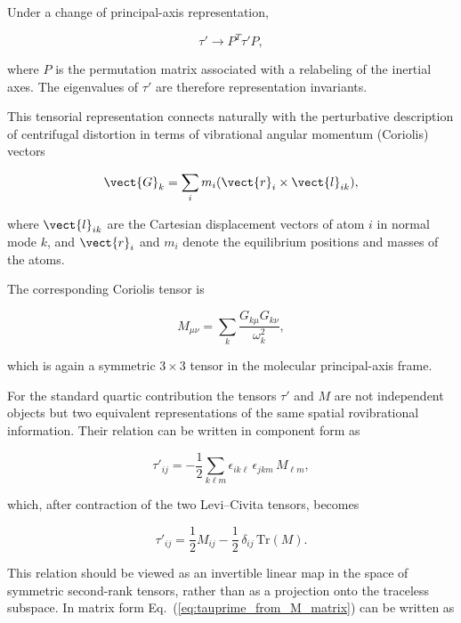 Under a change of principal-axis representation,

\begin{equation}
\tau' \longrightarrow P^{T}\tau' P,
\end{equation}

where $P$ is the permutation matrix associated with a relabeling of the
inertial axes.
The eigenvalues of $\tau'$ are therefore representation invariants.

This tensorial representation connects naturally with the perturbative
description of centrifugal distortion in terms of vibrational angular
momentum (Coriolis) vectors

\begin{equation}
\vect{G}_k =
\sum_i
m_i
(\vect{r}_i \times \vect{l}_{ik}),
\end{equation}

where $\vect{l}_{ik}$ are the Cartesian displacement vectors of atom
$i$ in normal mode $k$, and $\vect{r}_i$ and $m_i$ denote the equilibrium
positions and masses of the atoms.\cite{Mills1972,Wilson1955}

The corresponding Coriolis tensor is

\begin{equation}
M_{\mu\nu}=
\sum_k \frac{G_{k\mu}G_{k\nu}}{\omega_k^2},
\label{eq:Mtensor}
\end{equation}

which is again a symmetric $3\times3$ tensor in the molecular
principal-axis frame.

For the standard quartic contribution the tensors $\tau'$ and $M$
are not independent objects but two equivalent representations of the
same spatial rovibrational information.
Their relation can be written in component form as

\begin{equation}
\tau'_{ij}
=
-\frac12
\sum_{k\ell m}
\epsilon_{ik\ell}\,\epsilon_{jkm}\,M_{\ell m},
\label{eq:tauprime_from_M_components}
\end{equation}

which, after contraction of the two Levi--Civita tensors, becomes

\begin{equation}
\tau'_{ij}
=
\frac12 M_{ij}
-
\frac12\,\delta_{ij}\,\mathrm{Tr}(M).
\label{eq:tauprime_from_M_matrix}
\end{equation}

This relation should be viewed as an invertible linear map in the space
of symmetric second-rank tensors, rather than as a projection onto the
traceless subspace. In matrix form Eq.~(\ref{eq:tauprime_from_M_matrix})
can be written as

